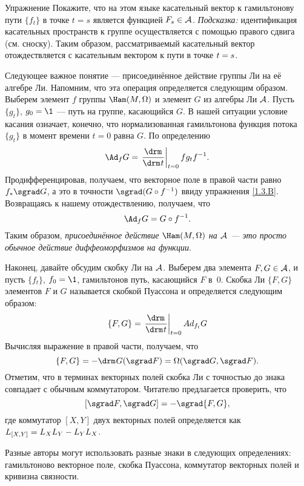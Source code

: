 \begin{thm}{Упражнение}\label{1.4.G}
Покажите, что на этом языке касательный вектор к гамильтонову пути $\{f_t\}$ в точке $t = s$ является функцией $F_s \in \mathcal{A}$.
\emph{Подсказка:} идентификация касательных пространств к группе осуществляется с помощью правого сдвига (см. сноску).
Таким образом, рассматриваемый касательный вектор отождествляется с
касательным вектором к пути  в точке $t \z= s$.
\end{thm}

Следующее важное понятие --- присоединённое действие группы Ли на её алгебре Ли.
Напомним, что эта операция определяется следующим образом.
Выберем элемент $f$ группы $\Ham (M, \Omega)$ и элемент $G$ из алгебры Ли $\mathcal{A}$.
Пусть $\{g_t\}$, $g_0 = \1$ --- путь на группе, касающийся $G$.
В нашей ситуации условие касания означает, конечно, что нормализованная гамильтонова функция потока $\{g_t\}$ в момент времени $t = 0$ равна $G$.
По определению 
\[\Ad_f G = \left.\frac{\d}{\d t}\right|_{t=0} fg_tf^{-1}.\]
Продифференцировав, получаем, что векторное поле в правой части равно $f_\ast \sgrad G$, а это в точности $\sgrad  (G\circ f^{-1})$ ввиду упражнения \ref{1.3.B}.
Возвращаясь к нашему отождествлению, получаем, что 
\[\Ad_f G = G \circ f^{-1}.\]
Таким образом, \emph{присоединённое действие $\Ham (M, \Omega)$ на $\mathcal{A}$ --- это просто обычное действие диффеоморфизмов на функции}.

Наконец, давайте обсудим скобку Ли на $\mathcal{A}$.
Выберем два элемента $F,G \in \mathcal{A}$, и пусть $\{f_t\}$, $f_0 = \1$, гамильтонов путь, касающийся $F$ в~$0$.
Скобка Ли $\{F, G\}$ элементов $F$ и $G$ называется скобкой Пуассона и определяется следующим образом: 
\[\{F, G\}=\left.\frac{\d}{\d t}\right|_{t=0}Ad_{f_t}G\]
Вычисляя выражение в правой части, получаем, что 
\[\{F, G\} = -\d G (\sgrad F) = \Omega (\sgrad G, \sgrad F).\]
Отметим, что в терминах векторных полей скобка Ли с точностью до знака совпадает с обычным коммутатором.
Читателю предлагается проверить, что 
\[[\sgrad F, \sgrad G] = -\sgrad  \{F, G\},\]
где коммутатор $[X, Y]$ двух векторных полей определяется как $L_{[X, Y]} \z= L_X L_Y -L_Y L_X$.

\begin{framed}
 Разные авторы могут использовать разные
знаки в следующих определениях:
гамильтоново векторное поле,
скобка Пуассона,
коммутатор векторных полей
и кривизна связности.
\end{framed}

